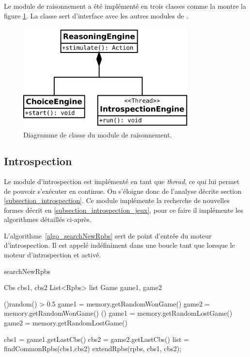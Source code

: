 
Le module de raisonnement a été implémenté en trois classes comme la montre la figure \ref{class_diag_reasoning_engine}. La classe  sert d'interface avec les autres modules de \cogito{}. 

\begin{figure}[H] 
\center
\includegraphics[width=0.8\textwidth]{files/class_diagram/reasoningEngine} 
\caption{Diagramme de classe du module de raisonnement.}
\label{class_diag_reasoning_engine}
\end{figure}

\subsection{Introspection}


Le module d'introspection est implémenté en tant que \emph{thread}, ce qui lui permet de pouvoir s'exécuter en continue. On s'éloigne donc de l'analyse décrite section \vref{subsection_introspection}. Ce module implémente la recherche de nouvelles formes décrit en \vref{subsection_introspection_jeux}, pour ce faire il implémente les algorithmes détaillés ci-après.


L'algorithme~\vref{algo_searchNewRpbs} sert de point d'entrée du moteur d'introspection. Il est appelé indéfiniment dans une boucle \og tant que \fg{} lorsque le moteur d'introspection et activé.


\begin{algorithm}[H]
	\caption{searchNewRpbs}
	\label{algo_searchNewRpbs}
  \vspace{0.2cm}
  
	Cbs cbs1, cbs2\;
	List<Rpbs> list\;	
	Game game1, game2\;
	
	\eIf(){random() > 0.5}
		{
			game1 = memory.getRandomWonGame()\;
			{
				game2 = memory.getRandomWonGame()\;
			}
		}()
		{
			game1 = memory.getRandomLostGame()\;
			{
				game2 = memory.getRandomLostGame()\;
			}
		}
  \vspace{0.2cm}
  
	cbs1 = game1.getLastCbs()\;
	cbs2 = game2.getLastCbs()\;
		{ 
			list = findCommonRpbs(cbs1,cbs2)\;
			{
				extendRpbs(rpbs, cbs1, cbs2);
			}
		}
		
\end{algorithm}

